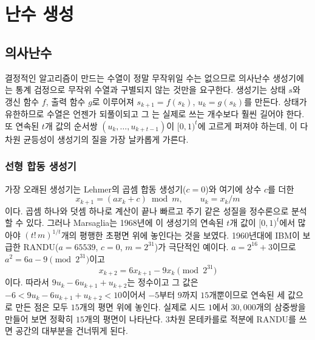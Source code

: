 \chapter{난수 생성}
\label{ch:random-numbers}


\section{의사난수}
\label{sec:pseudo-random}

결정적인 알고리즘이 만드는 수열이 정말 무작위일 수는 없으므로 의사난수 생성기에는 통계 검정으로 무작위 수열과 구별되지 않는 것만을 요구한다. 생성기는 상태 $s$와 갱신 함수 $f$, 출력 함수 $g$로 이루어져 $s_{k+1}=f(s_k)$, $u_k=g(s_k)$를 만든다. 상태가 유한하므로 수열은 언젠가 되풀이되고 그 는 실제로 쓰는 개수보다 훨씬 길어야 한다. 또 연속된 $t$개 값의 순서쌍 $(u_k,\dots,u_{k+t-1})$이 $[0,1)^t$에 고르게 퍼져야 하는데, 이 다차원 균등성이 생성기의 질을 가장 날카롭게 가른다.

\subsection{선형 합동 생성기}

가장 오래된 생성기는 Lehmer의 곱셈 합동 생성기($c=0$)\cite{lehmer1951}와 여기에 상수 $c$를 더한 
\[
x_{k+1}=(ax_k+c)\bmod m,\qquad u_k=x_k/m
\]
이다. 곱셈 하나와 덧셈 하나로 계산이 끝나 빠르고 주기 같은 성질을 정수론으로 분석할 수 있다\cite{knuth1997taocp2}. 그러나 Marsaglia는 1968년에 이 생성기의 연속된 $t$개 값이 $[0,1)^t$에서 많아야 $(t!\,m)^{1/t}$개의 평행한 초평면 위에 놓인다는 것을 보였다\cite{marsaglia1968}. 1960년대에 IBM이 보급한 RANDU($a=65539$, $c=0$, $m=2^{31}$)가 극단적인 예이다. $a=2^{16}+3$이므로 $a^2=6a-9\pmod{2^{31}}$이고
\[
x_{k+2}=6x_{k+1}-9x_k\pmod{2^{31}}
\]
이다. 따라서 $9u_k-6u_{k+1}+u_{k+2}$는 정수이고 그 값은 $-6<9u_k-6u_{k+1}+u_{k+2}<10$이어서 $-5$부터 $9$까지 $15$개뿐이므로 연속된 세 값으로 만든 점은 모두 $15$개의 평면 위에 놓인다. 실제로 시드 $1$에서 $30{,}000$개의 삼중쌍을 만들어 보면 정확히 $15$개의 평면이 나타난다. 3차원 몬테카를로 적분에 RANDU를 쓰면 공간의 대부분을 건너뛰게 된다.

